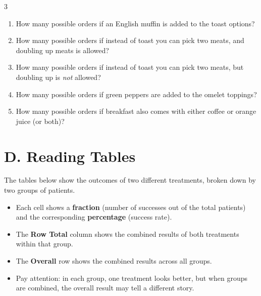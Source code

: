 \documentclass[9pt]{article}
\begin{document}
\begin{multicols}{3}
\begin{enumerate}[label=\arabic*., start=1]

\item  
How many possible orders if an English muffin is added to the toast options?

\item  
How many possible orders if instead of toast you can pick two meats, and doubling up meats is allowed?

\item  
How many possible orders if instead of toast you can pick two meats, but doubling up is \emph{not} allowed?

\item  
How many possible orders if green peppers are added to the omelet toppings?

\item  
How many possible orders if breakfast also comes with either coffee or orange juice (or both)?

\end{enumerate}

\end{multicols}
\newpage
\section*{D. Reading Tables}

The tables below show the outcomes of two different treatments, broken down by two groups of patients.  

\begin{itemize}
  \item Each cell shows a \textbf{fraction} (number of successes out of the total patients) and the corresponding \textbf{percentage} (success rate).
  \item The \textbf{Row Total} column shows the combined results of both treatments within that group.
  \item The \textbf{Overall} row shows the combined results across all groups.
  \item Pay attention: in each group, one treatment looks better, but when groups are combined, the overall result may tell a different story.
\end{itemize}
\end{document}
